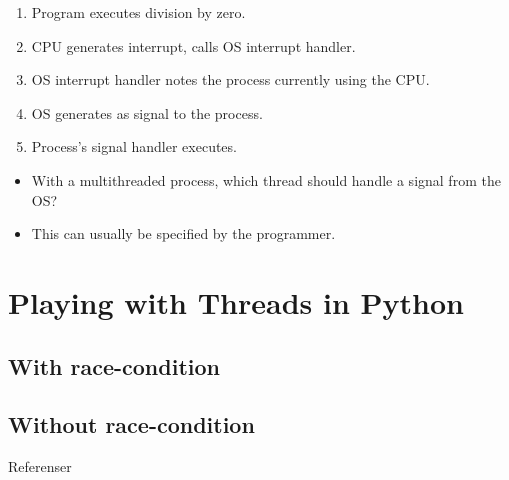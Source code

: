 \documentclass{beamer}
\begin{document}
\begin{frame}{\insertsubsectionhead}
  \begin{enumerate}
    \item Program executes division by zero.
    \item CPU generates interrupt, calls OS interrupt handler.
    \item OS interrupt handler notes the process currently using the CPU.
    \item OS generates as signal to the process.
    \item Process's signal handler executes.
  \end{enumerate}
\end{frame}

\begin{frame}{\insertsubsectionhead}
  \begin{itemize}
    \item With a multithreaded process, which thread should handle a signal 
      from the OS?

    \item This can usually be specified by the programmer.

  \end{itemize}
\end{frame}


\section{Playing with Threads in Python}

\subsection{With race-condition}

\begin{frame}{\insertsubsectionhead}
  
\end{frame}

\subsection{Without race-condition}

\begin{frame}{\insertsubsectionhead}
  
\end{frame}




\begin{frame}[allowframebreaks]{Referenser}
  \small
  \printbibliography
\end{frame}
\end{document}
